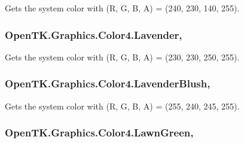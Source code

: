 Gets the system color with (R, G, B, A) = (240, 230, 140, 255). 

\hypertarget{struct_open_t_k_1_1_graphics_1_1_color4_ac68cc54c5a047d57d9f1da5ead050a54}{
\subsubsection[{Lavender}]{ Open\-T\-K.\-Graphics.\-Color4.\-Lavender\hspace{0.3cm}{\ttfamily [static]}, {\ttfamily [get]}}}\label{struct_open_t_k_1_1_graphics_1_1_color4_ac68cc54c5a047d57d9f1da5ead050a54}


Gets the system color with (R, G, B, A) = (230, 230, 250, 255). 

\hypertarget{struct_open_t_k_1_1_graphics_1_1_color4_af4e24d824eebc33012123704043b4d48}{
\subsubsection[{Lavender\-Blush}]{ Open\-T\-K.\-Graphics.\-Color4.\-Lavender\-Blush\hspace{0.3cm}{\ttfamily [static]}, {\ttfamily [get]}}}\label{struct_open_t_k_1_1_graphics_1_1_color4_af4e24d824eebc33012123704043b4d48}


Gets the system color with (R, G, B, A) = (255, 240, 245, 255). 

\hypertarget{struct_open_t_k_1_1_graphics_1_1_color4_a437c95c699bfdbb192b91ce31f04a01c}{
\subsubsection[{Lawn\-Green}]{ Open\-T\-K.\-Graphics.\-Color4.\-Lawn\-Green\hspace{0.3cm}{\ttfamily [static]}, {\ttfamily [get]}}}\label{struct_open_t_k_1_1_graphics_1_1_color4_a437c95c699bfdbb192b91ce31f04a01c}


